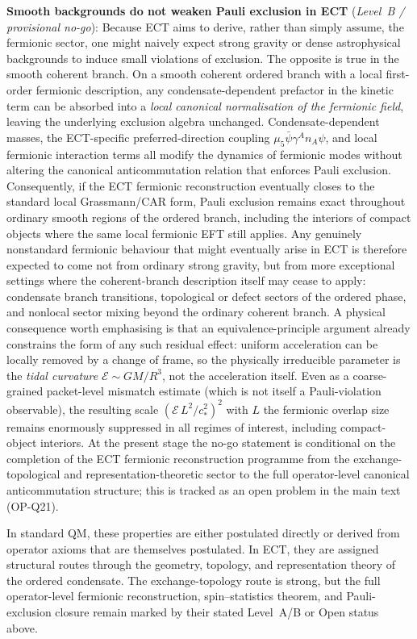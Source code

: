 \documentclass[11pt,a4paper]{article}
\begin{document}
\textbf{Smooth backgrounds do not weaken Pauli exclusion in ECT} (\emph{Level~B / provisional no-go}): Because ECT aims to derive, rather than simply assume, the fermionic sector, one might naively expect strong gravity or dense astrophysical backgrounds to induce small violations of exclusion. The opposite is true in the smooth coherent branch. On a smooth coherent ordered branch with a local first-order fermionic description, any condensate-dependent prefactor in the kinetic term can be absorbed into a \emph{local canonical normalisation of the fermionic field}, leaving the underlying exclusion algebra unchanged. Condensate-dependent masses, the ECT-specific preferred-direction coupling $\mu_5\bar\psi\gamma^A n_A\psi$, and local fermionic interaction terms all modify the dynamics of fermionic modes without altering the canonical anticommutation relation that enforces Pauli exclusion. Consequently, if the ECT fermionic reconstruction eventually closes to the standard local Grassmann/CAR form, Pauli exclusion remains exact throughout ordinary smooth regions of the ordered branch, including the interiors of compact objects where the same local fermionic EFT still applies. Any genuinely nonstandard fermionic behaviour that might eventually arise in ECT is therefore expected to come not from ordinary strong gravity, but from more exceptional settings where the coherent-branch description itself may cease to apply: condensate branch transitions, topological or defect sectors of the ordered phase, and nonlocal sector mixing beyond the ordinary coherent branch. A physical consequence worth emphasising is that an equivalence-principle argument already constrains the form of any such residual effect: uniform acceleration can be locally removed by a change of frame, so the physically irreducible parameter is the \emph{tidal curvature} $\mathcal{E}\sim GM/R^3$, not the acceleration itself. Even as a coarse-grained packet-level mismatch estimate (which is not itself a Pauli-violation observable), the resulting scale $(\mathcal{E}\,L^2/c_*^2)^2$ with $L$ the fermionic overlap size remains enormously suppressed in all regimes of interest, including compact-object interiors. At the present stage the no-go statement is conditional on the completion of the ECT fermionic reconstruction programme from the exchange-topological and representation-theoretic sector to the full operator-level canonical anticommutation structure; this is tracked as an open problem in the main text (OP-Q21).

In standard QM, these properties are either postulated directly or derived from operator axioms that are themselves postulated. In ECT, they are assigned structural routes through the geometry, topology, and representation theory of the ordered condensate. The exchange-topology route is strong, but the full operator-level fermionic reconstruction, spin--statistics theorem, and Pauli-exclusion closure remain marked by their stated Level~A/B or Open status above.
\end{document}
